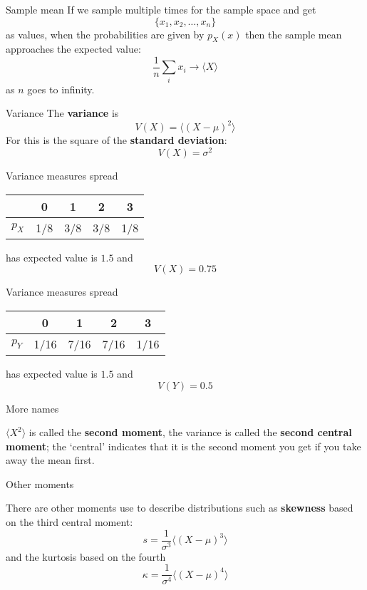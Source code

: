\documentclass{beamer}
\newcommand{\crish}{\color{reddish}}
\newcommand{\cbla}{\color{black}}
\begin{document}
\begin{frame}{Sample mean}
  If we sample multiple times for the sample space and get
  \crish$$\{x_1,x_2,\ldots,x_n\}$$\cbla{}
  as values, when the probabilities are given by \crish$p_X(x)$\cbla{} then the sample mean approaches the expected value:
  \crish$$
  \frac{1}{n}\sum_i x_i \rightarrow \langle X\rangle
  $$\cbla{}
  as \crish$n$\cbla{} goes to infinity.
\end{frame}

\begin{frame}{Variance}
  The \textbf{variance} is
\crish$$
V(X)=\langle (X-\mu)^2\rangle
$$\cbla{}
For this is the square of the
\textbf{standard deviation}:
\crish$$V(X)=\sigma^2$$\cbla{}
\end{frame}

\begin{frame}{Variance measures spread}
\color{purple}
  \begin{center}
\begin{tabular}{c|cccc}
&0&1&2&3\\
\hline
$p_X$&1/8&3/8&3/8&1/8
\end{tabular}
\end{center}
  \cbla{}
  has expected value is \crish$1.5$\cbla{} and
  \crish$$
  V(X)=0.75
  $$\cbla{}
\end{frame}


\begin{frame}{Variance measures spread}
\color{purple}
  \begin{center}
\begin{tabular}{c|cccc}
&0&1&2&3\\
  \hline
  $p_Y$&1/16&7/16&7/16&1/16
\end{tabular}
\end{center}
  \cbla{}
  has expected value is \crish$1.5$\cbla{} and
  \crish$$
  V(Y)=0.5
  $$\cbla{}
\end{frame}

\begin{frame}{More names}

\crish$\langle X^2\rangle$\cbla{}  is called the \textbf{second
  moment}, the variance is called the \textbf{second central moment};
the \lq{}central\rq{} indicates that it is the second moment you get
if you take away the mean first.

\end{frame}

\begin{frame}{Other moments}

There are other moments use to describe distributions such as \textbf{skewness} based on the third central moment:
\crish$$
s=\frac{1}{\sigma^3}\langle(X-\mu)^3\rangle
$$\cbla{}
and the kurtosis based on the fourth
\crish$$
\kappa=\frac{1}{\sigma^4}\langle(X-\mu)^4\rangle
$$\cbla{}
\end{frame}
\end{document}
